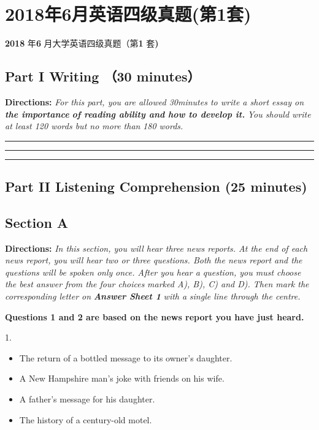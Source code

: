 \documentclass[UTF8,11pt]{ctexart}
\begin{document}
\section*{2018年6月英语四级真题(第1套)}
\textbf{2018} 年\textbf{6} 月大学英语四级真题（第\textbf{1} 套\textbf{)}


\subsection*{\textbf{Part I} \textbf{Writing} （\textbf{30 minutes}）}


\textbf{Directions:}\textit{ For this part, you are allowed 30minutes to write a short essay on}\textbf{\textit{ the importance}} \textbf{\textit{of reading ability and how to develop it.}}\textit{ You should write at least 120 words but no more than} \textit{180 words.} \par\noindent\rule{.95\linewidth}{.4pt}\par  \par\noindent\rule{.95\linewidth}{.4pt}\par  \par\noindent\rule{.95\linewidth}{.4pt}\par


\subsection*{\textbf{Part II} \textbf{Listening Comprehension} \textbf{(25 minutes)}}


\subsection*{\textbf{Section A}}


\textbf{Directions:}\textit{ In this section, you will hear three news reports. At the end of each news report, you} \textit{will hear two or three questions. Both the news report and the questions will be spoken only} \textit{once. After you hear a question, you must choose the best answer from the four choices} \textit{marked A), B), C) and D). Then mark the corresponding letter on}\textbf{\textit{ Answer Sheet 1}}\textit{ with a} \textit{single line through the centre.}


\textbf{Questions 1 and 2 are based on the news report you have just heard.}


1.


\begin{itemize}[leftmargin=2em,itemsep=.2em,topsep=.4em]\item[A.] The return of a bottled message to its owner's daughter.
\item[B.] A New Hampshire man's joke with friends on his wife.
\item[C.] A father's message for his daughter.
\item[D.] The history of a century-old motel.
\end{itemize}
\end{document}
